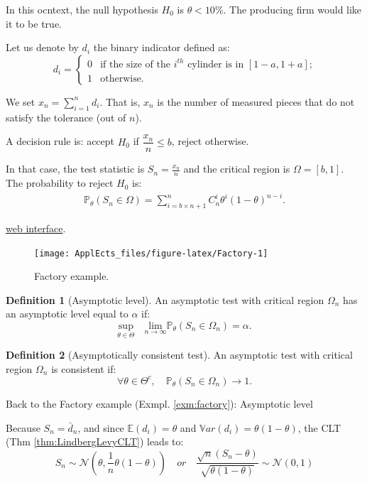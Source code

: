 \documentclass[
  12pt,
]{book}
\theoremstyle{definition}
\newtheorem{definition}{Definition}[chapter]
\theoremstyle{definition}
\theoremstyle{definition}
\theoremstyle{definition}
\theoremstyle{remark}
\begin{document}
In this ocntext, the null hypothesis \(H_0\) is \(\theta < 10\%\). The producing firm would like it to be true.

Let us denote by \(d_i\) the binary indicator defined as:
\[
d_i = \left\{
\begin{array}{cll}
0 & \mbox{if the size of the $i^{th}$ cylinder is in $[1-a,1+a]$;}\\
1 & \mbox{otherwise.}
\end{array}
\right.
\]

We set \(x_n=\sum_{i=1}^n d_i\). That is, \(x_n\) is the number of measured pieces that do not satisfy the tolerance (out of \(n\)).

A decision rule is: accept \(H_0\) if \(\dfrac{x_n}{n} \le b\), reject otherwise.

In that case, the test statistic is \(S_n=\frac{x_n}{n}\) and the critical region is \(\Omega = [b,1]\). The probability to reject \(H_0\) is:
\begin{eqnarray*}
\mathbb{P}_\theta(S_n \in \Omega) = \sum_{i=b \times n+1}^{n}C_{n}^i\theta^i(1-\theta)^{n-i}.
\end{eqnarray*}

\href{https://jrenne.shinyapps.io/Factory/}{web interface}.

\begin{figure}
\texttt{[image: ApplEcts\_files/figure-latex/Factory-1]} \caption{Factory example.}\label{fig:Factory}
\end{figure}

\begin{definition}[Asymptotic level]
\protect\hypertarget{def:asmyptlevel}{}\label{def:asmyptlevel}An asymptotic test with critical region \(\Omega_n\) has an asymptotic level equal to \(\alpha\) if:
\[
\underset{\theta \in \Theta}{\mbox{sup}} \quad \underset{n \rightarrow \infty}{\mbox{lim}} \mathbb{P}_\theta (S_n \in \Omega_n) = \alpha.
\]
\end{definition}

\begin{definition}[Asymptotically consistent test]
\protect\hypertarget{def:asmyptconsisttest}{}\label{def:asmyptconsisttest}An asymptotic test with critical region \(\Omega_n\) is consistent if:
\[
\forall \theta \in \Theta^c, \quad \mathbb{P}_\theta (S_n \in \Omega_n) \rightarrow 1.
\]
\end{definition}

Back to the Factory example (Exmpl. \ref{exm:factory}): Asymptotic level

Because \(S_n =\bar{d}_n\), and since \(\mathbb{E}(d_i)=\theta\) and \(\mathbb{V}ar(d_i)=\theta(1-\theta)\), the CLT (Thm \ref{thm:LindbergLevyCLT}) leads to:
\[
    S_n \sim \mathcal{N}\left(\theta,\frac{1}{n}\theta(1-\theta)\right) \quad or \quad \frac{\sqrt{n}(S_n-\theta)}{\sqrt{\theta(1-\theta)}} \sim \mathcal{N}(0,1)
    \]
\end{document}
